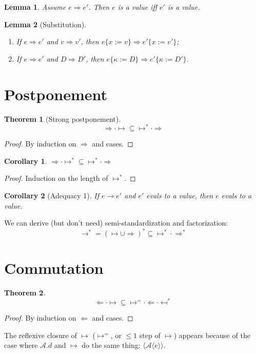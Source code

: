 \documentclass[a4paper, 11pt,titlepage, openright, twoside]{report}
\newcommand{\Int}{\Rightarrow}
\newcommand{\Tni}{\Leftarrow}
\newcommand{\subst}[2]{\{#1{:=}#2\}}
\newcommand{\A}{\mathcal{A}}
\newcommand{\+}{\enspace}
\newtheorem{corollary}{Corollary}
\newtheorem{lemma}{Lemma}
\newtheorem{theorem}{Theorem}
\begin{document}
\begin{lemma} Assume $e \Int e'$. Then $e$ is a value iff $e'$ is a value.
\end{lemma}

\begin{lemma}[Substitution]
	\item
	\begin{enumerate}
		\item If $e \Int e'$ and $v \Int v'$, then $e\subst{x}{v} \Int e'\subst{x}{v'}$;
		\item If $e \Int e'$ and $D \Int D'$, then $e\subst{κ}{D} \Int e'\subst{κ}{D'}$.
	\end{enumerate}
\end{lemma}


\section{Postponement}

\begin{theorem}[Strong postponement]
	$${\Int · ↦} ⊆ {↦^* · \Int}$$
\end{theorem}
\begin{proof}
	By induction on $\Int$ and cases.
\end{proof}
\begin{corollary}
	${\Int · ↦^*} ⊆ {↦^* · \Int}$
\end{corollary}
\begin{proof}
	Induction on the length of $↦^*$.
\end{proof}
\begin{corollary}[Adequacy 1]
	If $e → e'$ and $e'$ evals to a value, then $e$ evals to a value.
\end{corollary}

We can derive (but don't need) semi-standardization and factorization:
$$→^* = (↦ ∪ \Int)^* ⊆ {↦^* · \Int^*}$$

\section{Commutation}

\begin{theorem}
 \label{quasisubcomm}
	$${\Tni · ↦ } ⊆ {↦^= · \Tni · \mapsfrom^*}$$
\end{theorem}
\begin{proof}
	By induction on $\Tni$ and cases.
\end{proof}
The reflexive closure of $↦$ ($↦^=$, or $≤1$ step of $↦$) appears because of the case
where $\A.d$ and $↦$ do the same thing: $⟨\A⟨e⟩⟩$.
\end{document}
